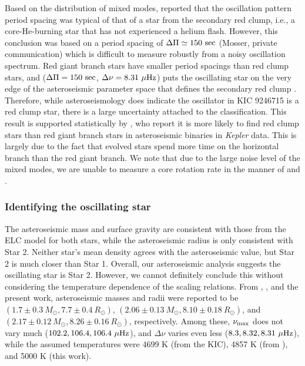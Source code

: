 Based on the distribution of mixed modes, \citet{gau14} reported that the oscillation pattern period spacing was typical of that of a star from the secondary red clump, i.e., a core-He-burning star that has not experienced a helium flash. However, this conclusion was based on a period spacing of $\Delta \Pi \simeq 150 \ \rm{sec}$ (Mosser, private communication) which is difficult to measure robustly from a noisy oscillation spectrum. Red giant branch stars have smaller period spacings than red clump stars, and ($\Delta \Pi = 150 \ \rm{sec}$, $\Delta \nu = 8.31 \ \mu \rm{Hz}$) puts the oscillating star on the very edge of the asteroseismic parameter space that defines the secondary red clump \citep{mos14}. Therefore, while asteroseismology does indicate the oscillator in KIC 9246715 is a red clump star, there is a large uncertainty attached to the classification. This result is supported statistically by \citet{mig14}, who report it is more likely to find red clump stars than red giant branch stars in asteroseismic binaries in \emph{Kepler} data. This is largely due to the fact that evolved stars spend more time on the horizontal branch than the red giant branch. We note that due to the large noise level of the mixed modes, we are unable to measure a core rotation rate in the manner of \citet{bec12} and \citet{mos12}.

\subsubsection{Identifying the oscillating star}\label{identifying}
The asteroseismic mass and surface gravity are consistent with those from the ELC model for both stars, while the asteroseismic radius is only consistent with Star 2. Neither star's mean density agrees with the asteroseismic value, but Star 2 is much closer than Star 1. Overall, our asteroseismic analysis suggests the oscillating star is Star 2. However, we cannot definitely conclude this without considering the temperature dependence of the scaling relations. From \citet{gau13}, \citet{gau14}, and the present work, asteroseismic masses and radii were reported to be $(1.7 \pm 0.3 \ M_\odot, 7.7 \pm 0.4 \ R_\odot)$, $(2.06 \pm 0.13 \ M_\odot, 8.10 \pm 0.18 \ R_\odot)$, and $(2.17 \pm 0.12 \ M_\odot, 8.26 \pm 0.16 \ R_\odot)$, respectively. Among these, $\nu_{\rm{max}}$ does not vary much ($102.2, 106.4, 106.4 \ \mu\rm{Hz}$), and $\Delta \nu$ varies even less ($8.3, 8.32, 8.31 \ \mu\rm{Hz}$), while the assumed temperatures were 4699 K (from the KIC), 4857 K (from \citealt{hub14.2}), and 5000 K (this work).

